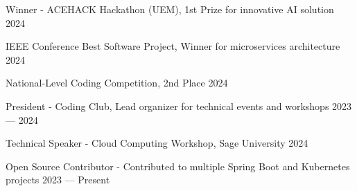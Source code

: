Winner - ACEHACK Hackathon (UEM), 1st Prize for innovative AI solution	\hfill 2024

IEEE Conference Best Software Project, Winner for microservices architecture	\hfill 2024

National-Level Coding Competition, 2nd Place	\hfill 2024

President - Coding Club, Lead organizer for technical events and workshops	\hfill 2023 --- 2024

Technical Speaker - Cloud Computing Workshop, Sage University	\hfill 2024

Open Source Contributor - Contributed to multiple Spring Boot and Kubernetes projects	\hfill 2023 --- Present

